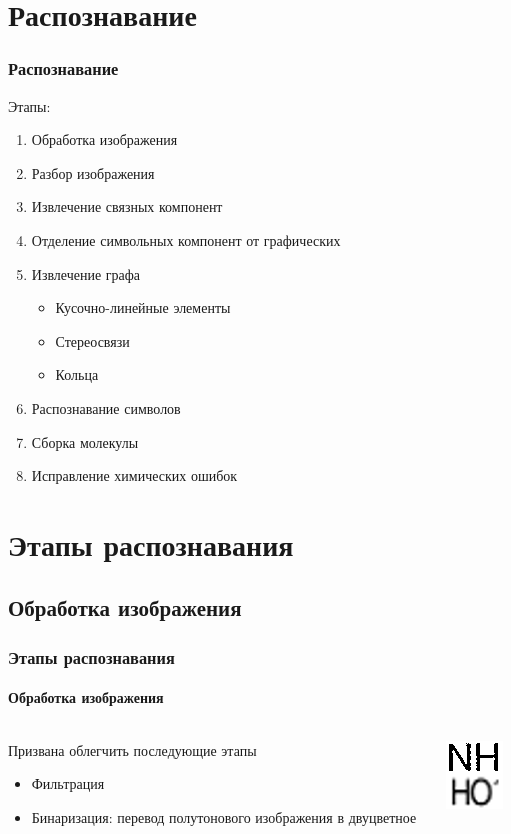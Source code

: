 \section{Распознавание}

\begin{frame}
  \frametitle{Распознавание}
  Этапы:
  \begin{enumerate}
    \item Обработка изображения
    \item Разбор изображения
    \item Извлечение связных компонент
    \item Отделение символьных компонент от графических
    \item Извлечение графа
      \begin{itemize}
        \item Кусочно-линейные элементы 
        \item Стереосвязи
        \item Кольца
      \end{itemize}
    \item Распознавание символов
    \item Сборка молекулы
    \item Исправление химических ошибок
  \end{enumerate}
\end{frame}

\section{Этапы распознавания}
\subsection{Обработка изображения}

\begin{frame}
  \frametitle{Этапы распознавания}
  \framesubtitle{Обработка изображения}
  \begin{columns}
      \begin{column}{0.5\textwidth}
         Призвана облегчить последующие этапы 
        \begin{itemize}
         \item Фильтрация
         \item Бинаризация: перевод полутонового изображения в двуцветное
         \end{itemize}
      \end{column}
      \begin{column}{0.5\textwidth}
      \includegraphics[scale=2.5]{media/bad.png}
      \end{column}
   \end{columns}
\end{frame}

